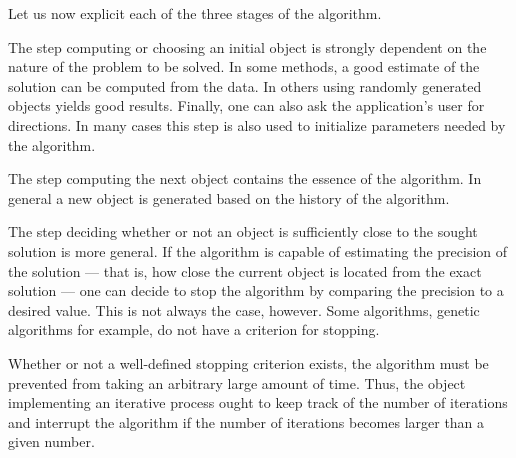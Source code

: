 \documentclass[twoside]{book}
\begin{document}
\noindent Let us now explicit each of the three stages of the
algorithm.

The step computing or choosing an initial object is strongly
dependent on the nature of the problem to be solved. In some
methods, a good estimate of the solution can be computed from the
data. In others using randomly generated objects yields good
results. Finally, one can also ask the application's user for
directions. In many cases this step is also used to initialize
parameters needed by the algorithm.

The step computing the next object contains the essence of the
algorithm. In general a new object is generated based on the
history of the algorithm.

The step deciding whether or not an object is sufficiently close
to the sought solution is more general. If the algorithm is
capable of estimating the precision of the solution --- that is,
how close the current object is located from the exact solution
--- one can decide to stop the algorithm by comparing the
precision to a desired value. This is not always the case,
however. Some algorithms, genetic algorithms for example, do not
have a criterion for stopping.

Whether or not a well-defined stopping criterion exists, the
algorithm must be prevented from taking an arbitrary large amount
of time. Thus, the object implementing an iterative process ought
to keep track of the number of iterations and interrupt the
algorithm if the number of iterations becomes larger than a given
number.
\end{document}
